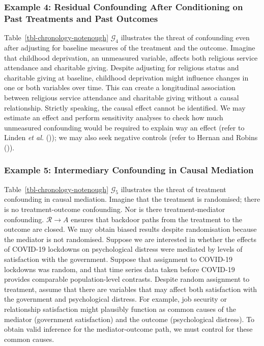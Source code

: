 \documentclass[
  single column]{article}
\begin{document}
\subsubsection{Example 4: Residual Confounding After Conditioning on
Past Treatments and Past
Outcomes}\label{example-4-residual-confounding-after-conditioning-on-past-treatments-and-past-outcomes}

Table~\ref{tbl-chronology-notenough} \(\mathcal{G}_{4}\) illustrates the
threat of confounding even after adjusting for baseline measures of the
treatment and the outcome. Imagine that childhood deprivation, an
unmeasured variable, affects both religious service attendance and
charitable giving. Despite adjusting for religious status and charitable
giving at baseline, childhood deprivation might influence changes in one
or both variables over time. This can create a longitudinal association
between religious service attendance and charitable giving without a
causal relationship. Strictly speaking, the causal effect cannot be
identified. We may estimate an effect and perform sensitivity analyses
to check how much unmeasured confounding would be required to explain
way an effect (refer to Linden \emph{et al.}
()); we may also seek negative
controls (refer to Hernan and Robins
()).

\subsubsection{Example 5: Intermediary Confounding in Causal
Mediation}\label{example-5-intermediary-confounding-in-causal-mediation}

Table~\ref{tbl-chronology-notenough} \(\mathcal{G}_5\) illustrates the
threat of treatment confounding in causal mediation. Imagine that the
treatment is randomised; there is no treatment-outcome confounding. Nor
is there treatment-mediator confounding. \(\mathcal{R} \to A\) ensures
that backdoor paths from the treatment to the outcome are closed. We may
obtain biased results despite randomisation because the mediator is not
randomised. Suppose we are interested in whether the effects of COVID-19
lockdowns on psychological distress were mediated by levels of
satisfaction with the government. Suppose that assignment to COVID-19
lockdowns was random, and that time series data taken before COVID-19
provides comparable population-level contrasts. Despite random
assignment to treatment, assume that there are variables that may affect
both satisfaction with the government and psychological distress. For
example, job security or relationship satisfaction might plausibly
function as common causes of the mediator (government satisfaction) and
the outcome (psychological distress). To obtain valid inference for the
mediator-outcome path, we must control for these common causes.
\end{document}
